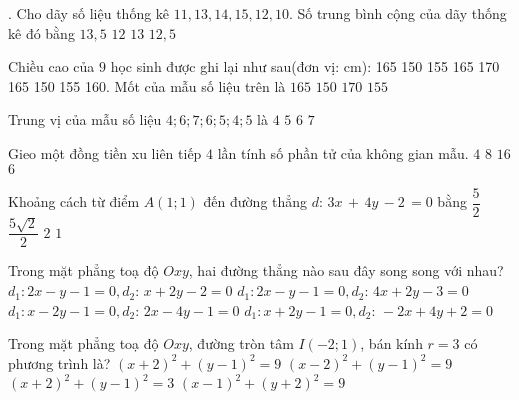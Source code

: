 \begin{ex}
. Cho dãy số liệu thống kê $11{,}13,14{,}15,12{,}10$. Số trung bình cộng của dãy thống kê đó bằng
\choice
{$13{,}5$}
{$12$}
{$13$}
{\True $12{,}5$}
\end{ex}
\begin{ex}
 Chiều cao của $9$ học sinh được ghi lại như sau(đơn vị: cm): 165 150 155 165 170 165 150 155 160. Mốt của mẫu số liệu trên là
\choice
{\True $165$}
{$150$}
{$170$}
{$155$}
\end{ex}
\begin{ex}
 Trung vị của mẫu số liệu $4;6;7;6;5;4;5$ là
\choice
{$4$}
{\True $5$}
{$6$}
{$7$}
\end{ex}
\begin{ex}
 Gieo một đồng tiền xu liên tiếp $4$ lần tính số phần tử của không gian mẫu.
\choice
{$4$}
{$8$}
{\True $16$}
{$6$}
\end{ex}
\begin{ex}
 Khoảng cách từ điểm $A\left(1;1\right)$ đến đường thẳng $d\colon \,3x\,+\,4y\,-2\,=0$ bằng
\choice
{$\dfrac{5}{2}$}
{$\dfrac{5\sqrt{2}}{2}$}
{$2$}
{\True $1$}
\end{ex}
\begin{ex}
 Trong mặt phẳng toạ độ $Oxy$, hai đường thẳng nào sau đây song song với nhau?
\choice
{$d_1\colon 2x-y-1=0,d_2\colon \,x+2y-2=0$}
{$d_1\colon 2x-y-1=0,d_2\colon \,4x+2y-3=0$}
{\True $d_1\colon x-2y-1=0,d_2\colon \,2x-4y-1=0$}
{$d_1\colon x+2y-1=0,d_2\colon \,-2x+4y+2=0$}
\end{ex}
\begin{ex}
 Trong mặt phẳng toạ độ $Oxy$, đường tròn tâm $I\left(-2;1\right)$, bán kính $r=3$ có phương trình là?
\choice
{\True $(x+2)^2+(y-1)^2=9$}
{${{(x-2)}^2}+{{(y-1)}^2}=9$}
{${{(x+2)}^2}+{{(y-1)}^2}=3$}
{${{(x-1)}^2}+{{(y+2)}^2}=9$}
\end{ex}
